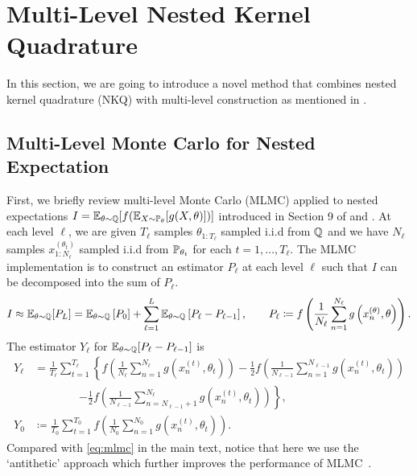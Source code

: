 \section{Multi-Level Nested Kernel Quadrature}
In this section, we are going to introduce a novel method that combines nested kernel quadrature (NKQ) with multi-level construction as mentioned in .

\subsection{Multi-Level Monte Carlo for Nested Expectation}
First, we briefly review multi-level Monte Carlo (MLMC) applied to nested expectations $I = \operatorname{\mathbb{E}}_{\theta \sim \mathbb{Q}} [ f(\operatorname{\mathbb{E}}_{X \sim \mathbb{P}_\theta} [ g(X, \theta) ] ) ]$ introduced in Section 9 of \citet{Giles2015} and \citet{giles2019decision}.
At each level $\ell$, we are given $T_\ell$ samples $\theta_{1:T_\ell}$ sampled i.i.d from $\mathbb{Q}$ and we have $N_\ell$ samples $x_{1:N_\ell}^{(\theta_t)}$ sampled i.i.d from $\mathbb{P}_{\theta_t}$ for each $t = 1, \ldots, T_\ell$. 
The MLMC implementation is to construct an estimator $P_\ell$ at each level $\ell$ such that $I$ can be decomposed into the sum of $P_\ell$.
\begin{align*}
    I \approx \operatorname{\mathbb{E}}_{\theta \sim \mathbb{Q}}[P_L] = \operatorname{\mathbb{E}}_{\theta \sim \mathbb{Q}}\left[P_0\right] + \sum_{\ell=1}^L \operatorname{\mathbb{E}}_{\theta \sim \mathbb{Q}}\left[P_{\ell}-P_{\ell-1}\right], \qquad P_{\ell} \coloneq f \left( \frac{1}{N_{\ell}} \sum_{n=1}^{N_\ell} g\left(x_n^{(\theta)}, \theta \right) \right) .
\end{align*}
The estimator $Y_\ell$ for $\operatorname{\mathbb{E}}_{\theta \sim \mathbb{Q}}[P_\ell - P_{\ell-1}]$ is
\begin{align*}
    Y_{\ell} &= \frac{1}{T_\ell} \sum_{t=1}^{T_{\ell}} \left\{ f \left( \frac{1}{N_\ell} \sum_{n=1}^{N_\ell} g\left(x_n^{(t)}, \theta_t\right)\right) - \frac{1}{2} f\left( \frac{1}{N_{\ell-1}} \sum_{n=1}^{N_{\ell-1}} g\left(x_n^{(t)}, \theta_t\right)\right) \right. \\
    &\qquad\qquad \left.- \frac{1}{2} f\left( \frac{1}{N_{\ell-1}} \sum_{n=N_{\ell-1}+1}^{N_\ell} g\left(x_n^{(t)}, \theta_t\right)\right)\right\}, \\
    Y_0 &\coloneq \frac{1}{T_0} \sum_{t=1}^{T_0} f \left( \frac{1}{N_0} \sum_{n=1}^{N_0} g \left(x_n^{(t)}, \theta_t \right) \right) .
\end{align*}
Compared with \eqref{eq:mlmc} in the main text, notice that here we use the `antithetic' approach which further improves the performance of MLMC~\citep[Section 9]{Giles2015}.
